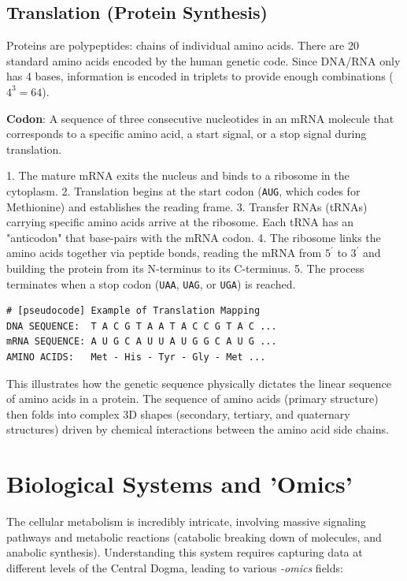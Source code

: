\subsection{Translation (Protein Synthesis)}
Proteins are polypeptides: chains of individual amino acids. There are 20 standard amino acids encoded by the human genetic code. Since DNA/RNA only has 4 bases, information is encoded in triplets to provide enough combinations ($4^3 = 64$).

\begin{important}
  \textbf{Codon}: A sequence of three consecutive nucleotides in an mRNA molecule that corresponds to a specific amino acid, a start signal, or a stop signal during translation.
\end{important}

1. The mature mRNA exits the nucleus and binds to a ribosome in the cytoplasm.
2. Translation begins at the start codon (\texttt{AUG}, which codes for Methionine) and establishes the reading frame.
3. Transfer RNAs (tRNAs) carrying specific amino acids arrive at the ribosome. Each tRNA has an "anticodon" that base-pairs with the mRNA codon.
4. The ribosome links the amino acids together via peptide bonds, reading the mRNA from $5^{\prime}$ to $3^{\prime}$ and building the protein from its N-terminus to its C-terminus.
5. The process terminates when a stop codon (\texttt{UAA}, \texttt{UAG}, or \texttt{UGA}) is reached.


\begin{verbatim}
# [pseudocode] Example of Translation Mapping
DNA SEQUENCE:  T A C G T A A T A C C G T A C ...
mRNA SEQUENCE: A U G C A U U A U G G C A U G ...
AMINO ACIDS:   Met - His - Tyr - Gly - Met ...
\end{verbatim}
This illustrates how the genetic sequence physically dictates the linear sequence of amino acids in a protein. The sequence of amino acids (primary structure) then folds into complex 3D shapes (secondary, tertiary, and quaternary structures) driven by chemical interactions between the amino acid side chains.

\section{Biological Systems and 'Omics'}
The cellular metabolism is incredibly intricate, involving massive signaling pathways and metabolic reactions (catabolic breaking down of molecules, and anabolic synthesis). Understanding this system requires capturing data at different levels of the Central Dogma, leading to various \textit{-omics} fields:

